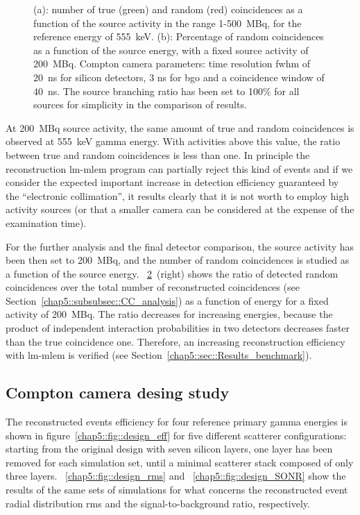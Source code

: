 \begin{figure}
\begin{subfigure}[t]{.5\textwidth}
  \label{chap5::fig::timing_energy}
\end{subfigure}
\caption{(a): number of true (green) and random (red) coincidences as a function of the source activity in the range 1-500~MBq, for the reference energy of 555~keV. (b): Percentage of random coincidences as a function of the source energy, with a fixed source activity of 200~MBq. Compton camera parameters: time resolution \gls{fwhm} of 20~ns for silicon detectors, 3 ns for \gls{bgo} and a coincidence window of 40~ns. The source branching ratio has been set to 100\% for all sources for simplicity in the comparison of results.}
\label{chap5::fig::timig_en_coinc}
\end{figure} 

At 200~MBq source activity, the same amount of true and random coincidences is observed at 555~keV gamma energy. With activities above this value, the ratio between true and random coincidences is less than one. In principle the reconstruction \gls{lm-mlem} program can partially reject this kind of events and if we consider the expected important increase in detection efficiency guaranteed by the \enquote{electronic collimation}, it results clearly that it is not worth to employ high activity sources (or that a smaller camera can be considered at the expense of the examination time).

For the further analysis and the final detector comparison, the source activity has been then set to 200~MBq, and the number of random coincidences is studied as a function of the source energy. \figurename~\ref{chap5::fig::timig_en_coinc}~(right) shows the ratio of detected random coincidences over the total number of reconstructed coincidences (see Section~\ref{chap5::subsubsec::CC_analysis}) as a function of energy for a fixed activity of 200~MBq. The ratio decreases for increasing energies, because the product of independent interaction probabilities in two detectors decreases faster than the true coincidence one. Therefore, an increasing reconstruction efficiency with \gls{lm-mlem} is verified (see Section~\ref{chap5::sec::Results_benchmark}).

\subsection{Compton camera desing study}\label{chap5::subsec::Results_CC_SPECT_design}
The reconstructed events efficiency for four reference primary gamma energies is shown in figure~\ref{chap5::fig::design_eff} for five different scatterer configurations: starting from the original design with seven silicon layers, one layer has been removed for each simulation set, until a minimal scatterer stack composed of only three layers. \figurename~\ref{chap5::fig::design_rms} and \figurename~\ref{chap5::fig::design_SONR} show the results of the same sets of simulations for what concerns the reconstructed event radial distribution \gls{rms} and the signal-to-background ratio, respectively.  

